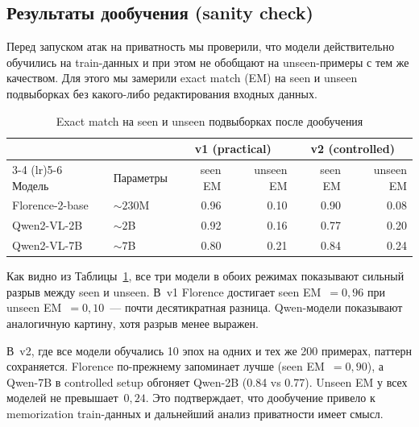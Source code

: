 \documentclass[a4paper,12pt]{extarticle}
\begin{document}
\subsection{Результаты дообучения (sanity check)}
\label{sec:results_sanity}

Перед запуском атак на приватность мы проверили, что модели действительно обучились на train-данных и при этом не обобщают на unseen-примеры с тем же качеством. Для этого мы замерили exact match (EM) на seen и unseen подвыборках без какого-либо редактирования входных данных.


\begin{table}[ht]
	\caption{Exact match на seen и unseen подвыборках после дообучения}
	\label{table:sanity_check}
	\footnotesize
	\centering
	\begin{tabular}{llrrrr}
		\toprule
		& & \multicolumn{2}{c}{v1 (practical)} & \multicolumn{2}{c}{v2 (controlled)} \\
		\cmidrule(lr){3-4} \cmidrule(lr){5-6}
		Модель & Параметры & seen EM & unseen EM & seen EM & unseen EM \\
		\midrule
		Florence-2-base & ${\sim}230$M & 0.96 & 0.10 & 0.90 & 0.08 \\
		Qwen2-VL-2B    & ${\sim}2$B   & 0.92 & 0.16 & 0.77 & 0.20 \\
		Qwen2-VL-7B    & ${\sim}7$B   & 0.80 & 0.21 & 0.84 & 0.24 \\
		\bottomrule
	\end{tabular}
\end{table}

Как видно из Таблицы~\ref{table:sanity_check}, все три модели в обоих режимах показывают сильный разрыв между seen и unseen. В~v1 Florence достигает seen EM~$= 0{,}96$ при unseen EM~$= 0{,}10$~--- почти десятикратная разница. Qwen-модели показывают аналогичную картину, хотя разрыв менее выражен.

В~v2, где все модели обучались 10 эпох на одних и тех же 200 примерах, паттерн сохраняется. Florence по-прежнему запоминает лучше (seen EM~$= 0{,}90$), а Qwen-7B в controlled setup обгоняет Qwen-2B (0.84 vs 0.77). Unseen EM у всех моделей не превышает~$0{,}24$. Это подтверждает, что дообучение привело к memorization train-данных и дальнейший анализ приватности имеет смысл.
\end{document}
